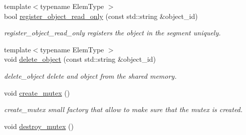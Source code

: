 \begin{DoxyCompactItemize}
{\footnotesize template$<$typename Elem\+Type $>$ }\\bool \hyperlink{classshared__memory_1_1SharedMemorySegment_a830fee375b183642b999f6a64240f280}{register\+\_\+object\+\_\+read\+\_\+only} (const std\+::string \&object\+\_\+id)
\begin{DoxyCompactList}\small\item\em register\+\_\+object\+\_\+read\+\_\+only registers the object in the segment uniquely. \end{DoxyCompactList}\item 
{\footnotesize template$<$typename Elem\+Type $>$ }\\void \hyperlink{classshared__memory_1_1SharedMemorySegment_abc658e54589c81e89b147f0b3fbd67b8}{delete\+\_\+object} (const std\+::string \&object\+\_\+id)
\begin{DoxyCompactList}\small\item\em delete\+\_\+object delete and object from the shared memory. \end{DoxyCompactList}\item 
void \hyperlink{classshared__memory_1_1SharedMemorySegment_ac8bbbc98968a8a2b3fe35c50e0768d8f}{create\+\_\+mutex} ()\hypertarget{classshared__memory_1_1SharedMemorySegment_ac8bbbc98968a8a2b3fe35c50e0768d8f}{}\label{classshared__memory_1_1SharedMemorySegment_ac8bbbc98968a8a2b3fe35c50e0768d8f}

\begin{DoxyCompactList}\small\item\em create\+\_\+mutex small factory that allow to make sure that the mutex is created. \end{DoxyCompactList}\item 
void \hyperlink{classshared__memory_1_1SharedMemorySegment_a64d69c4965cd448040bc20e4f9009abc}{destroy\+\_\+mutex} ()\hypertarget{classshared__memory_1_1SharedMemorySegment_a64d69c4965cd448040bc20e4f9009abc}{}\label{classshared__memory_1_1SharedMemorySegment_a64d69c4965cd448040bc20e4f9009abc}


\end{DoxyCompactItemize}
